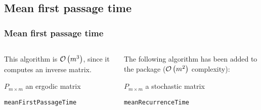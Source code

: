 \subsection{Mean first passage time}
 \begin{frame}\frametitle{Mean first passage time}
    \vspace{2.5em}
    \begin{columns}
    \begin{column}{0.5\textwidth}

        This algorithm is \(\mathcal{O}\left(m^3\right)\), since it computes an inverse matrix.
        
        \begin{algorithm}[H]
        \begin{algorithmic}[1]
        \REQUIRE $P_{m \times m}$ an ergodic matrix
        \NEWLINE
        \end{algorithmic}
        \caption{\small\texttt{meanFirstPassageTime}}
        \label{alg:mfpt}
        \end{algorithm}
    \end{column}
    \begin{column}{0.5\textwidth}

        The following algorithm has been added to the package (\(\mathcal{O}\left(m^2\right)\) 
        complexity):

        \begin{algorithm}[H]
        \begin{algorithmic}[1]
        \REQUIRE $P_{m \times m}$ a stochastic matrix
        \NEWLINE
            \ENDIF
            \ENDFOR
        \ENDFOR
        \end{algorithmic}
        \caption{\small\texttt{meanRecurrenceTime}}
        \label{alg:mrt}
        \end{algorithm}
    \end{column}
    \end{columns}
\end{frame}

